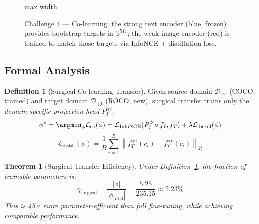 \documentclass[12pt,a4paper]{article}
\theoremstyle{definition}
\newtheorem{definition}{Definition}[section]
\theoremstyle{plain}
\newtheorem{theorem}{Theorem}[section]
\theoremstyle{remark}
\newcommand{\Sph}{\mathbb{S}}
\newcommand{\Norm}[1]{\left\|#1\right\|_2}
\begin{document}
\begin{figure}[H]
\begin{adjustbox}{max width=\textwidth}
\end{adjustbox}
\caption{Challenge 4 — Co-learning: the strong text encoder (blue, frozen) provides bootstrap targets in $\Sph^{511}$; the weak image encoder (red) is trained to match those targets via InfoNCE + distillation loss.}
\label{fig:colearn}
\end{figure}

\subsection{Formal Analysis}

\begin{definition}[Surgical Co-learning Transfer]
\label{def:surgical}
Given source domain $\mathcal{D}_{\text{src}}$ (COCO, trained) and target domain $\mathcal{D}_{\text{tgt}}$ (ROCO, new), surgical transfer trains only the \emph{domain-specific projection head} $P_I^{\text{tgt}}$:
\[
  \phi^* = \argmin_\phi \mathcal{L}_{\text{co}}(\phi) = \mathcal{L}_{\text{InfoNCE}}(P_I^\phi \circ f_I, f_T) + \lambda \mathcal{L}_{\text{distill}}(\phi)
\]
\[
  \mathcal{L}_{\text{distill}}(\phi) = \frac{1}{B}\sum_{i=1}^B \Norm{f_T^{\text{tgt}}(c_i) - f_T^{\text{src}}(c_i)}_2^2
\]
\end{definition}

\begin{theorem}[Surgical Transfer Efficiency]
Under Definition~\ref{def:surgical}, the fraction of trainable parameters is:
\[
  \eta_{\text{surgical}} = \frac{|\phi|}{|\phi_{\text{total}}|} = \frac{5.25}{235.15} \approx 2.23\%
\]
This is 45× more parameter-efficient than full fine-tuning, while achieving comparable performance.
\end{theorem}
\end{document}
